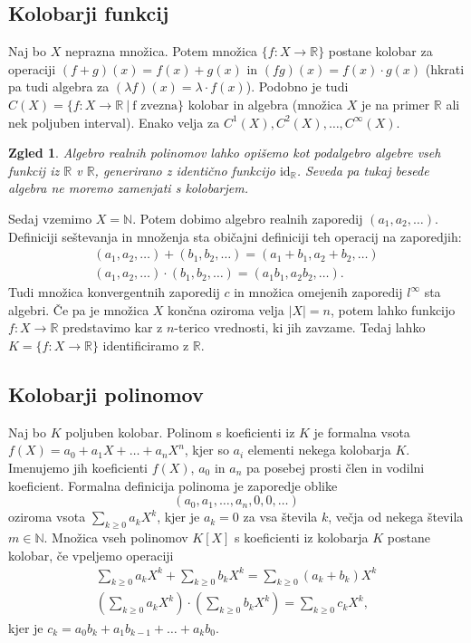 \documentclass[10pt, a4paper]{article}
\newtheorem{zgled}{Zgled}[section]
\newcommand{\N}{\mathbb {N}}
\newcommand{\R}{\mathbb {R}}
\begin{document}
\subsection{Kolobarji funkcij}

Naj bo $X$ neprazna množica. Potem množica $\{f: X \to \R\}$ postane kolobar za operaciji
$(f + g)(x) = f(x) + g(x)$ in $(fg)(x) = f(x) \cdot g(x)$ (hkrati pa tudi algebra za $(\lambda f)(x) = \lambda \cdot f(x)$).
Podobno je tudi $C(X) = \{f: X \to \R\ |\ \mathrm{\text{$f$ zvezna}}\}$ kolobar in algebra (množica $X$ je na primer $\R$ ali nek poljuben interval).
Enako velja za $C^1(X), C^2(X), \dots, C^\infty (X)$.

\begin{zgled}
  Algebro realnih polinomov lahko opišemo kot podalgebro algebre vseh funkcij iz $\R$ v $\R$,
  generirano z identično funkcijo $\mathrm{id}_\R$. Seveda pa tukaj besede algebra ne moremo zamenjati s kolobarjem.
\end{zgled}

Sedaj vzemimo $X = \N$. Potem dobimo algebro realnih zaporedij $(a_1, a_2, \dots)$.
Definiciji seštevanja in množenja sta običajni definiciji teh operacij na zaporedjih:
\begin{gather*}
  (a_1, a_2, \dots) + (b_1, b_2, \dots) = (a_1 + b_1, a_2 + b_2, \dots)\\
  (a_1, a_2, \dots) \cdot (b_1, b_2, \dots) = (a_1 b_1, a_2 b_2, \dots).
\end{gather*}
Tudi množica konvergentnih zaporedij $c$ in množica omejenih zaporedij $l^\infty$ sta algebri.
Če pa je množica $X$ končna oziroma velja $|X| = n$, potem lahko funkcijo $f:X \to \R$ predstavimo kar 
z $n$-terico vrednosti, ki jih zavzame. Tedaj lahko $K = \{f: X \to \R\}$ identificiramo z $\R$.

\subsection{Kolobarji polinomov}

Naj bo $K$ poljuben kolobar. Polinom s koeficienti iz $K$ je formalna vsota 
$f(X) = a_0 + a_1 X + \dots + a_n X^n$, kjer so $a_i$ elementi nekega kolobarja $K$.
Imenujemo jih koeficienti $f(X)$, $a_0$ in $a_n$ pa posebej prosti člen in vodilni koeficient.
Formalna definicija polinoma je zaporedje oblike $$(a_0, a_1, \dots, a_n, 0, 0, \dots)$$
oziroma vsota $\sum_{k \geq 0} a_k X^k$, kjer je $a_k = 0$ za vsa števila $k$, večja od nekega števila $m \in \N$.
Množica vseh polinomov $K[X]$ s koeficienti iz kolobarja $K$ postane kolobar, če vpeljemo operaciji
\begin{gather*}
  \sum_{k \geq 0} a_k X^k + \sum_{k \geq 0} b_k X^k = \sum_{k \geq 0} (a_k + b_k) X^k\\
  \left(\sum_{k \geq 0} a_k X^k\right) \cdot \left(\sum_{k \geq 0} b_k X^k\right)  = \sum_{k \geq 0} c_k X^k,
\end{gather*}
kjer je $c_k = a_0 b_k + a_1 b_{k-1} + \dots + a_k b_0$.
\end{document}
